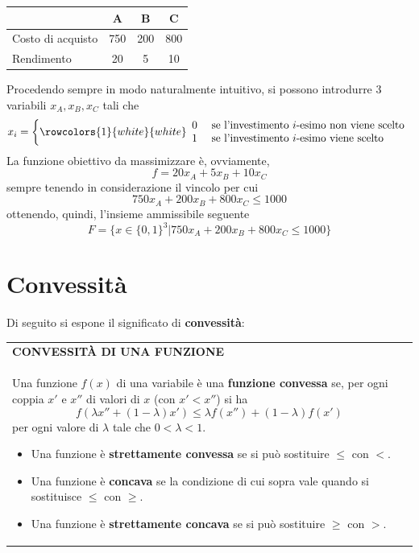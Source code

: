 \documentclass[a4paper]{extarticle}
\renewcommand\arraystretch{}
\begin{document}
\begin{table}[H]
\setlength{\tabcolsep}{8pt}
\renewcommand{\arraystretch}{1.5}
\noindent
\centering
\begin{tabular}{l|ccc}
    & A & B & C\\
    \hline
    Costo di acquisto & 750 & 200 & 800\\
    Rendimento         & 20  & 5   & 10
\end{tabular}
\end{table}

\vspace{1em}
\noindent
Procedendo sempre in modo naturalmente intuitivo, si possono introdurre $3$ variabili $x_A,x_B,x_C$ tali che
\[x_i = \left\{
    \rowcolors{1}{white}{white}
    \begin{array}{ll}
        0 & \text{ se l'investimento } i \text{-esimo non viene scelto}\\
        1 & \text{ se l'investimento } i \text{-esimo viene scelto}\\
    \end{array}
\right.\]
La funzione obiettivo da massimizzare è, ovviamente,
\[f = 20x_A + 5x_B + 10x_C\]
sempre tenendo in considerazione il vincolo per cui
\[750 x_A + 200 x_B + 800 x_C \leq 1000\]
ottenendo, quindi, l'insieme ammissibile seguente
\[F = \{x \in \{0,1\}^3 \vert 750 x_A + 200 x_B + 800 x_C \leq 1000\}\]

\newpage
\noindent
\section{Convessità}
Di seguito si espone il significato di \textbf{convessità}:

\vspace{1em}
\setlength{\tabcolsep}{14pt}
\renewcommand{\arraystretch}{2}
\noindent
\begin{tabularx}{\textwidth}{@{}|P|@{}}
    \hline
    {\textbf{CONVESSITÀ DI UNA FUNZIONE}}\\
    \parbox{\linewidth}{Una funzione $f(x)$ di una variabile è una \textbf{funzione convessa} se, per ogni coppia $x'$ e $x''$ di valori di $x$ (con $x' < x''$) si ha
    \[f(\lambda x'' + (1-\lambda)x') \leq \lambda f(x'') + (1-\lambda) f(x')\]
    per ogni valore di $\lambda$ tale che $0 < \lambda < 1$.
    \begin{itemize}
        \item Una funzione è \textbf{strettamente convessa} se si può sostituire $\leq$ con $<$.
        \item Una funzione è \textbf{concava} se la condizione di cui sopra vale quando si sostituisce $\leq$ con $\geq$.
        \item Una funzione è \textbf{strettamente concava} se si può sostituire $\geq$ con $>$.
    \end{itemize}
    \vspace{1mm}}\\
    \hline
\end{tabularx}
\end{document}
